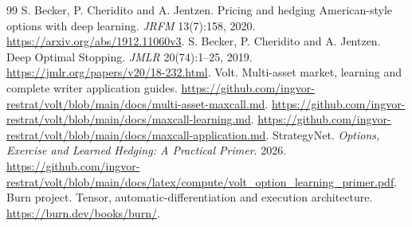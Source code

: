 \documentclass[8pt]{strategynet-journal}
\begin{document}
\clearpage
\begin{SNcolumns}
\begin{thebibliography}{99}
 S. Becker, P. Cheridito and A. Jentzen. Pricing and hedging American-style options with deep learning. \emph{JRFM} 13(7):158, 2020. \url{https://arxiv.org/abs/1912.11060v3}.
 S. Becker, P. Cheridito and A. Jentzen. Deep Optimal Stopping. \emph{JMLR} 20(74):1--25, 2019. \url{https://jmlr.org/papers/v20/18-232.html}.
 Volt. Multi-asset market, learning and complete writer application guides. \url{https://github.com/ingvor-restrat/volt/blob/main/docs/multi-asset-maxcall.md}. \url{https://github.com/ingvor-restrat/volt/blob/main/docs/maxcall-learning.md}. \url{https://github.com/ingvor-restrat/volt/blob/main/docs/maxcall-application.md}.
 StrategyNet. \emph{Options, Exercise and Learned Hedging: A Practical Primer}. 2026. \url{https://github.com/ingvor-restrat/volt/blob/main/docs/latex/compute/volt_option_learning_primer.pdf}.
 Burn project. Tensor, automatic-differentiation and execution architecture. \url{https://burn.dev/books/burn/}.
\end{thebibliography}
\end{SNcolumns}
\end{document}
